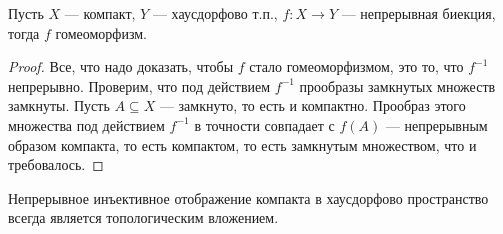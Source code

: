 \begin{theorem}
	Пусть $X$ --- компакт, $Y$ --- хаусдорфово т.п., $f \colon X \to Y$ ---
	непрерывная биекция, тогда $f$ гомеоморфизм.
\end{theorem}
\begin{proof}
	Все, что надо доказать, чтобы $f$ стало гомеоморфизмом, это то, что $f^{-1}$
	непрерывно. Проверим, что под действием $f^{-1}$ прообразы замкнутых множеств
	замкнуты. Пусть $A \subseteq X$ --- замкнуто, то есть и компактно. Прообраз
	этого множества под действием $f^{-1}$ в точности совпадает с $f(A)$ ---
	непрерывным образом компакта, то есть компактом, то есть замкнутым множеством,
	что и требовалось. 
\end{proof}

\begin{corollary}
	Непрерывное инъективное отображение компакта в хаусдорфово пространство
	всегда является топологическим вложением.
\end{corollary}
